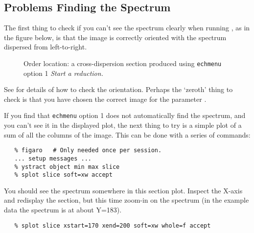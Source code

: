 {{\subsection{Problems Finding the Spectrum}

The first thing to check if you can't see the spectrum clearly when
running 
, as in
{the figure below,} is that the
image is correctly oriented with the spectrum dispersed from left-to-right.

\begin{htmlonly}
\begin{figure}
\begin{center}
\leavevmode\epsfysize=136mm

\parbox{140mm}{
\caption{Order location: a cross-dispersion section produced using
{\tt echmenu} option 1 {\sl Start a reduction.}}
\label{fi_order_locate_again}
}
\end{center}
\end{figure}
\end{htmlonly}

See \scspec{\S\ref{inspecting_the_images}}
{} for details of how
to check the orientation.  Perhaps the `zeroth' thing to check is that you
have chosen the correct image for the parameter
\@.

If you find that \verb+echmenu+ option 1 does not automatically find the
spectrum, and you can't see it in the displayed plot, the next thing to
try is a simple plot of a sum of all the columns of the image.  This can
be done with a series of  commands:

{
\scspec{\small}{ }
\begin{verbatim}
   % figaro   # Only needed once per session.
   ... setup messages ...
   % ystract object min max slice
   % splot slice soft=xw accept
\end{verbatim}
}

You should see the spectrum somewhere in this section plot.  Inspect the
X-axis and redisplay the section, but this time zoom-in on the spectrum
(in the example data the spectrum is at about Y=183).

{
\scspec{\small}{ }
\begin{verbatim}
   % splot slice xstart=170 xend=200 soft=xw whole=f accept
\end{verbatim}
}

}}
